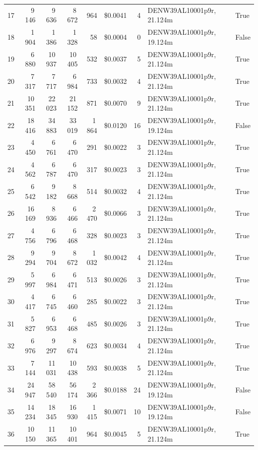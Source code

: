\documentclass[a4paper,11pt]{article}
\begin{document}
\begin{table}[ht]
\begin{tabular}{r r r r r r r p{3cm} l}
17 & 9\,146 & 9\,636 & 8\,672 & 964 & \$0.0041 & 4 & DENW39AL10001p9r, 21.124m & True \\
18 & 1\,904 & 1\,386 & 1\,328 & 58 & \$0.0004 & 0 & DENW39AL10001p9r, 19.124m & False \\
19 & 6\,880 & 10\,937 & 10\,405 & 532 & \$0.0037 & 5 & DENW39AL10001p9r, 21.124m & True \\
20 & 7\,317 & 7\,717 & 6\,984 & 733 & \$0.0032 & 4 & DENW39AL10001p9r, 21.124m & True \\
21 & 10\,351 & 22\,023 & 21\,152 & 871 & \$0.0070 & 9 & DENW39AL10001p9r, 21.124m & True \\
22 & 18\,416 & 34\,883 & 33\,019 & 1\,864 & \$0.0120 & 16 & DENW39AL10001p9r, 19.124m & False \\
23 & 4\,450 & 6\,761 & 6\,470 & 291 & \$0.0022 & 3 & DENW39AL10001p9r, 21.124m & True \\
24 & 4\,562 & 6\,787 & 6\,470 & 317 & \$0.0023 & 3 & DENW39AL10001p9r, 21.124m & True \\
25 & 6\,542 & 9\,182 & 8\,668 & 514 & \$0.0032 & 4 & DENW39AL10001p9r, 21.124m & True \\
26 & 16\,169 & 8\,936 & 6\,466 & 2\,470 & \$0.0066 & 3 & DENW39AL10001p9r, 21.124m & True \\
27 & 4\,756 & 6\,796 & 6\,468 & 328 & \$0.0023 & 3 & DENW39AL10001p9r, 21.124m & True \\
28 & 9\,294 & 9\,704 & 8\,672 & 1\,032 & \$0.0042 & 4 & DENW39AL10001p9r, 21.124m & True \\
29 & 5\,997 & 6\,984 & 6\,471 & 513 & \$0.0026 & 3 & DENW39AL10001p9r, 21.124m & True \\
30 & 4\,417 & 6\,745 & 6\,460 & 285 & \$0.0022 & 3 & DENW39AL10001p9r, 21.124m & True \\
31 & 5\,827 & 6\,953 & 6\,468 & 485 & \$0.0026 & 3 & DENW39AL10001p9r, 21.124m & True \\
32 & 6\,976 & 9\,297 & 8\,674 & 623 & \$0.0034 & 4 & DENW39AL10001p9r, 21.124m & True \\
33 & 7\,144 & 11\,031 & 10\,438 & 593 & \$0.0038 & 5 & DENW39AL10001p9r, 21.124m & True \\
34 & 24\,947 & 58\,540 & 56\,174 & 2\,366 & \$0.0188 & 24 & DENW39AL10001p9r, 19.124m & False \\
35 & 14\,234 & 18\,345 & 16\,930 & 1\,415 & \$0.0071 & 10 & DENW39AL10001p9r, 19.124m & False \\
36 & 10\,150 & 11\,365 & 10\,401 & 964 & \$0.0045 & 5 & DENW39AL10001p9r, 21.124m & True \\

\end{tabular}
\end{table}
\end{document}
